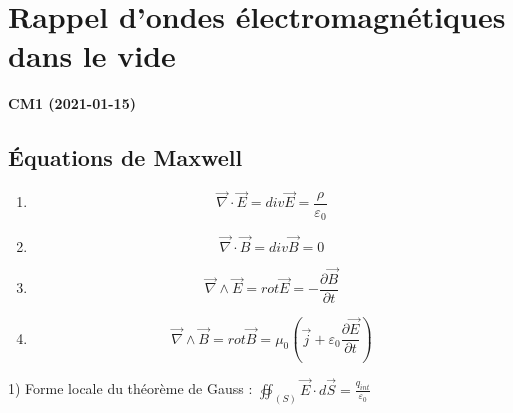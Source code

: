 \documentclass[12pt,a4paper]{report}
\author{Malo Kerebel}
\begin{document}
\begin{titlepage}

\end{titlepage}

\tableofcontents

\chapter{Rappel d'ondes électromagnétiques dans le vide}

\begin{center}
\textbf{CM1 (2021-01-15)}
\end{center}

\section{Équations de Maxwell}

\begin{enumerate}
	\item \[
		\vec{\nabla} \cdot \vec{E} = div \vec{E} = \dfrac{\rho}{\varepsilon_0}
	\]
	\item \[
		\vec{\nabla} \cdot \vec{B} = div \vec{B} = 0
	\]
	\item \[
		\vec{\nabla} \wedge \vec{E} = rot \vec{E} = -\dfrac{\partial \vec{B}}{\partial t}
	\]
	\item \[
		\vec{\nabla} \wedge \vec{B} = rot \vec{B} = \mu_0 \left( \vec{j} + \varepsilon_0 \dfrac{\partial \vec{E}}{\partial t} \right)
	\]
\end{enumerate}

1) Forme locale du théorème de Gauss : \( \oiint_{(S)} \vec{E} \cdot d\vec{S} = \frac{q_{int}}{\varepsilon_0}\)
\end{document}
